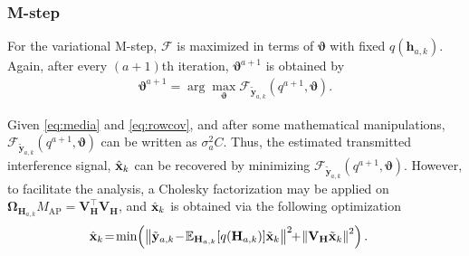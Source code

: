 \documentclass[conference,twocolumn,a4paper]{IEEEtran}
\theoremstyle{remark} \newtheorem{remark}{Remark}
\begin{document}
\subsubsection{M-step}
For the variational $\mathrm{M}$-step, $\mathcal{F}$ is maximized in terms of $\mathbf{\vartheta}$ with fixed $q(\mathbf{h}_{a,k})$. Again, after every $(a\!+\!1)$th iteration, $\mathbf{\vartheta}^{a+1}$ is obtained by
\begin{align}
	\mathbf{\vartheta}^{a+1}=\arg \max _{\mathbf{\vartheta}} \mathcal{F}_{\tilde{\mathbf{y}}_{a,k}}\!\left(q^{a+1}, \mathbf{\vartheta}\right).
\end{align}

 Given \eqref{eq:media} and \eqref{eq:rowcov}, and after some mathematical manipulations,  $\mathcal{F}_{\tilde{\mathbf{y}}_{a,k}}\!\left(q^{a+1}, \mathbf{\vartheta}\right)$ can be written as $\sigma_{a}^2C.$
Thus, the estimated transmitted interference signal, $\Hat{\mathbf{x}}_{k}$  can be recovered by minimizing $\mathcal{F}_{\tilde{\mathbf{y}}_{a,k}}\!\left(q^{a+1}, \mathbf{\vartheta}\right)$. 
However, to facilitate the analysis, a Cholesky factorization may be applied on $\boldsymbol{\Omega}_{\mathbf{H}_{a,k}}  M_{\mathrm{AP}}=\mathbf{V}_{\mathbf{H}}^{\top} \mathbf{V}_{\mathbf{H}}$, and $\Hat{\mathbf{x}}_{k}$ is obtained via the following optimization
\begin{align}\label{eq:optimalx}
	\Hat{\mathbf{x}}_{k} & \!=\!\min\!\left(\left\|\tilde{\mathbf{y}}_{a,k}\!-\!\mathbb{E}_{\mathbf{H}_{a,k}}[q(\mathbf{H}_{a,k})] \tilde{\mathbf{x}}_{k}\right\|^{2}\!\!+\!\left\|\mathbf{V}_{\mathbf{H}} \tilde{\mathbf{x}}_{k}\right\|^{2}\right).
\end{align}
\end{document}
